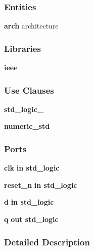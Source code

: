 \subsubsection*{Entities}
\begin{DoxyCompactItemize}
\item 
{\bf arch} architecture
\end{DoxyCompactItemize}
\subsubsection*{Libraries}
 \begin{DoxyCompactItemize}
\item 
{\bf ieee} 
\end{DoxyCompactItemize}
\subsubsection*{Use Clauses}
 \begin{DoxyCompactItemize}
\item 
{\bf std\+\_\+logic\+\_}   
\item 
{\bf numeric\+\_\+std}   
\end{DoxyCompactItemize}
\subsubsection*{Ports}
 \begin{DoxyCompactItemize}
\item 
{\bf clk}  {\bfseries {\bfseries \textcolor{keywordflow}{in}\textcolor{vhdlchar}{ }}} {\bfseries \textcolor{comment}{std\+\_\+logic}\textcolor{vhdlchar}{ }} 
\item 
{\bf reset\+\_\+n}  {\bfseries {\bfseries \textcolor{keywordflow}{in}\textcolor{vhdlchar}{ }}} {\bfseries \textcolor{comment}{std\+\_\+logic}\textcolor{vhdlchar}{ }} 
\item 
{\bf d}  {\bfseries {\bfseries \textcolor{keywordflow}{in}\textcolor{vhdlchar}{ }}} {\bfseries \textcolor{comment}{std\+\_\+logic}\textcolor{vhdlchar}{ }} 
\item 
{\bf q}  {\bfseries {\bfseries \textcolor{keywordflow}{out}\textcolor{vhdlchar}{ }}} {\bfseries \textcolor{comment}{std\+\_\+logic}\textcolor{vhdlchar}{ }} 
\end{DoxyCompactItemize}


\subsubsection{Detailed Description}


